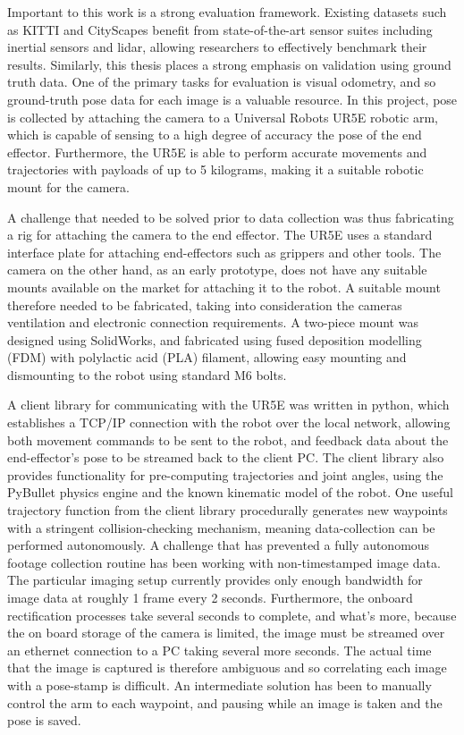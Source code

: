 \documentclass[openany]{book}
\begin{document}
Important to this work is a strong evaluation framework. Existing datasets such as KITTI and CityScapes benefit from state-of-the-art sensor suites including inertial sensors and lidar, allowing researchers to effectively benchmark their results. Similarly, this thesis places a strong emphasis on validation using ground truth data. One of the primary tasks for evaluation is visual odometry, and so ground-truth pose data for each image is a valuable resource. In this project, pose is collected by attaching the camera to a Universal Robots UR5E robotic arm, which is capable of sensing to a high degree of accuracy the pose of the end effector. Furthermore, the UR5E is able to perform accurate movements and trajectories with payloads of up to 5 kilograms, making it a suitable robotic mount for the camera. 

A challenge that needed to be solved prior to data collection was thus fabricating a rig for attaching the camera to the end effector. The UR5E uses a standard interface plate for attaching end-effectors such as grippers and other tools. The camera on the other hand, as an early prototype, does not have any suitable mounts available on the market for attaching it to the robot. A suitable mount therefore needed to be fabricated, taking into consideration the cameras ventilation and electronic connection requirements. A two-piece mount was designed using SolidWorks, and fabricated using fused deposition modelling (FDM) with polylactic acid (PLA) filament, allowing easy mounting and dismounting to the robot using standard M6 bolts. 

A client library for communicating with the UR5E was written in python, which establishes a TCP/IP connection with the robot over the local network, allowing both movement commands to be sent to the robot, and feedback data about the end-effector's pose to be streamed back to the client PC. The client library also provides functionality for pre-computing trajectories and joint angles, using the PyBullet physics engine and the known kinematic model of the robot. One useful trajectory function from the client library procedurally generates new waypoints with a stringent collision-checking mechanism, meaning data-collection can be performed autonomously. A challenge that has prevented a fully autonomous footage collection routine has been working with non-timestamped image data. The particular imaging setup currently provides only enough bandwidth for image data at roughly 1 frame every 2 seconds. Furthermore, the onboard rectification processes take several seconds to complete, and what's more, because the on board storage of the camera is limited, the image must be streamed over an ethernet connection to a PC taking several more seconds. The actual time that the image is captured is therefore ambiguous and so correlating each image with a pose-stamp is difficult. An intermediate solution has been to manually control the arm to each waypoint, and pausing while an image is taken and the pose is saved. 
\end{document}
